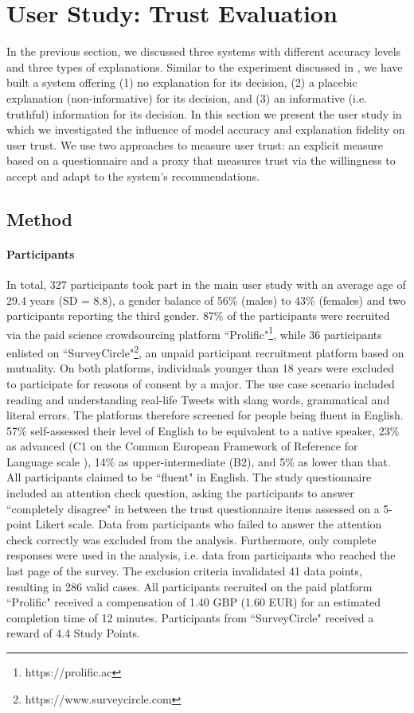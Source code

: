 \section{User Study: Trust Evaluation}
In the previous section, we discussed three systems with different accuracy levels and three types of explanations. Similar to the experiment discussed in \cite{langer1978mindlessness}, we have built a system offering (1) no explanation for its decision, (2) a placebic explanation (non-informative) for its decision, and (3) an informative (i.e. truthful) information for its decision. In this section we present the user study in which we investigated the influence of model accuracy and explanation fidelity on user trust. We use two approaches to measure user trust: an explicit measure based on a questionnaire and a proxy that measures trust via the willingness to accept and adapt to the system's recommendations.


\subsection{Method}

\paragraph{Participants}
In total, 327 participants took part in the main user study with an average age of 29.4 years (SD = 8.8), a gender balance of 56\% (males) to 43\% (females) and two participants reporting the third gender. 87\% of the participants were recruited via the paid science crowdsourcing platform ``Prolific"\footnote{https://prolific.ac}, while 36 participants enlisted on ``SurveyCircle"\footnote{https://www.surveycircle.com}, an unpaid participant recruitment platform based on mutuality.\newline
On both platforms, individuals younger than 18 years were excluded to participate for reasons of consent by a major. The use case scenario included reading and understanding real-life Tweets with slang words, grammatical and literal errors. The platforms therefore screened for people being fluent in English. 57\% self-assessed their level of English to be equivalent to a native speaker, 23\% as advanced (C1 on the Common European Framework of Reference for Language scale \cite{council2001common}), 14\% as upper-intermediate (B2), and 5\% as lower than that. All participants claimed to be ``fluent" in English. The study questionnaire included an attention check question, asking the participants to answer ``completely disagree" in between the trust questionnaire items assessed on a 5-point Likert scale. Data from participants who failed to answer the attention check correctly was excluded from the analysis. Furthermore, only complete responses were used in the analysis, i.e. data from participants who reached the last page of the survey. The exclusion criteria invalidated 41 data points, resulting in 286 valid cases.\newline
All participants recruited on the paid platform ``Prolific" received a compensation of 1.40 GBP (1.60 EUR) for an estimated completion time of 12 minutes. Participants from ``SurveyCircle" received a reward of 4.4 Study Points.

